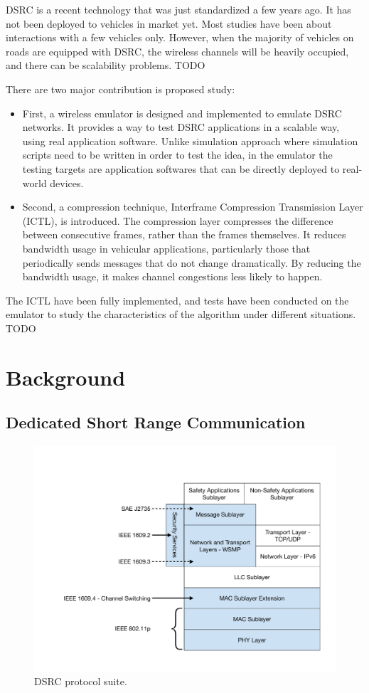 \documentclass[12pt]{report}
\begin{document}
DSRC is a recent technology that was just standardized a few years ago. It has not been deployed to vehicles in market yet. Most studies have been about interactions with a few vehicles only. However, when the majority of vehicles on roads are equipped with DSRC, the wireless channels will be heavily occupied, and there can be scalability problems. TODO

There are two major contribution is proposed study:
\begin{itemize}
  \item First, a wireless emulator is designed and implemented to emulate DSRC networks. It provides a way to test DSRC applications in a scalable way, using real application software. Unlike simulation approach where simulation scripts need to be written in order to test the idea, in the emulator the testing targets are application softwares that can be directly deployed to real-world devices.
  \item Second, a compression technique, Interframe Compression Transmission Layer (ICTL), is introduced. The compression layer compresses the difference between consecutive frames, rather than the frames themselves. It reduces bandwidth usage in vehicular applications, particularly those that periodically sends messages that do not change dramatically. By reducing the bandwidth usage, it makes channel congestions less likely to happen.
\end{itemize}

The ICTL have been fully implemented, and tests have been conducted on the emulator to study the characteristics of the algorithm under different situations. TODO

\chapter{Background}

\section{Dedicated Short Range Communication}

\begin{figure}[htb]
  \begin{center}
    \includegraphics[width=.7\columnwidth]{figures/dsrc.pdf}
    \caption{\label{fig:dsrc}DSRC protocol suite.}
  \end{center}
\end{figure}
\end{document}
